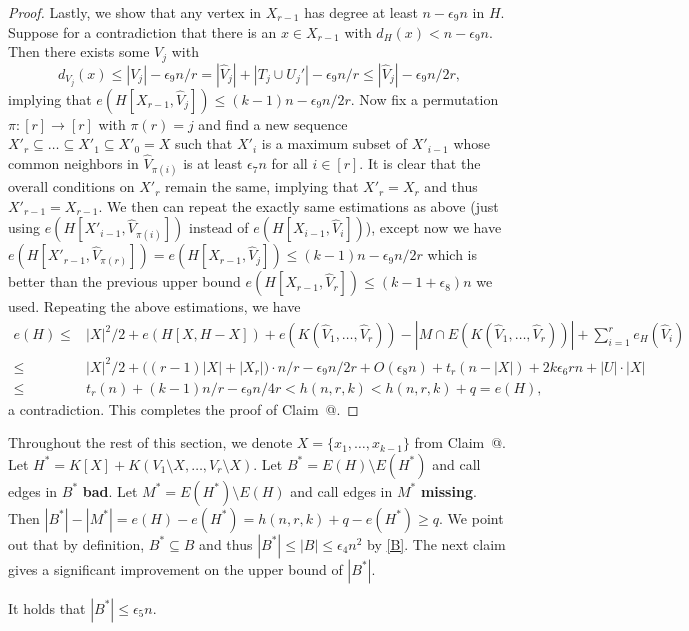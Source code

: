 \documentclass[10pt]{article}
\makeatletter
\newcommand*{\rom}[1]{\expandafter\@slowromancap\romannumeral #1@}
\makeatother
\begin{document}
\begin{proof}
Lastly, we show that any vertex in $X_{r-1}$ has degree at least $n-\epsilon_9n$ in $H$.
Suppose for a contradiction that there is an $x\in X_{r-1}$ with $d_H(x)< n-\epsilon_9n$.
Then there exists some $V_j$ with $$d_{V_j}(x)\leq |V_j|-\epsilon_9n/r=|\widehat{V}_{j}|+|T_j\cup U_j'|-\epsilon_9n/r\leq |\widehat{V}_{j}|-\epsilon_9n/2r,$$
implying that $e(H[X_{r-1},\widehat{V}_{j}])\leq (k-1)n-\epsilon_9n/2r$.
Now fix a permutation $\pi:[r]\to [r]$ with $\pi(r)=j$ and find a new sequence $X'_r\subseteq \ldots \subseteq  X'_1\subseteq X'_0=X$ such that
$X'_i$ is a maximum subset of $X'_{i-1}$ whose common neighbors in $\widehat{V}_{\pi(i)}$ is at least $\epsilon_7n$ for all $i\in [r]$.
It is clear that the overall conditions on $X'_r$ remain the same, implying that $X'_r=X_r$ and thus $X'_{r-1}=X_{r-1}$.
We then can repeat the exactly same estimations as above (just using $e(H[X'_{i-1},\widehat{V}_{\pi(i)}])$ instead of $e(H[X_{i-1},\widehat{V}_i])$),
except now we have $e(H[X'_{r-1},\widehat{V}_{\pi(r)}])=e(H[X_{r-1},\widehat{V}_{j}])\leq (k-1)n-\epsilon_9n/2r$
which is better than the previous upper bound $e(H[X_{r-1},\widehat{V}_r])\leq (k-1+\epsilon_8)n$ we used.
Repeating the above estimations, we have
\begin{align*}
e(H)\leq & |X|^2/2+e(H[X,H-X])+ e(K(\widehat{V}_1,\ldots,\widehat{V}_r))-|M\cap E(K(\widehat{V}_1,\ldots,\widehat{V}_r))|+\sum_{i=1}^{r}e_H(\widehat{V}_i)\\
\leq & |X|^2/2+\big((r-1)|X|+|X_r|\big)\cdot n/r-\epsilon_9n/2r+O(\epsilon_8n)+t_r(n-|X|)+2k\epsilon_6 rn+|U|\cdot |X|\\
\leq & t_r(n)+(k-1)n/r-\epsilon_9n/4r <h(n,r,k)< h(n,r,k)+q=e(H),
\end{align*}
a contradiction. This completes the proof of Claim~\rom{1}. \end{proof}


Throughout the rest of this section, we denote $X=\{x_1,\ldots,x_{k-1}\}$ from Claim~\rom{1}.
Let $H^*=K[X]+K(V_1\setminus X,\ldots,V_r\setminus X).$
Let $B^*=E(H)\setminus E(H^*)$ and call edges in $B^*$ {\bf bad}.
Let $M^*=E(H^*)\setminus E(H)$ and call edges in $M^*$ {\bf missing}.
Then $|B^*|-|M^*|=e(H)-e(H^*)=h(n,r,k)+q-e(H^*)\geq q$.
We point out that by definition, $B^*\subseteq B$ and thus $|B^*|\leq |B|\leq \epsilon_4 n^2$ by \eqref{B}.
The next claim gives a significant improvement on the upper bound of $|B^*|$.

\medskip

\noindent {\bf Claim~\rom{2}.} It holds that $|B^\ast|\leq \epsilon_5 n$.
\end{document}
